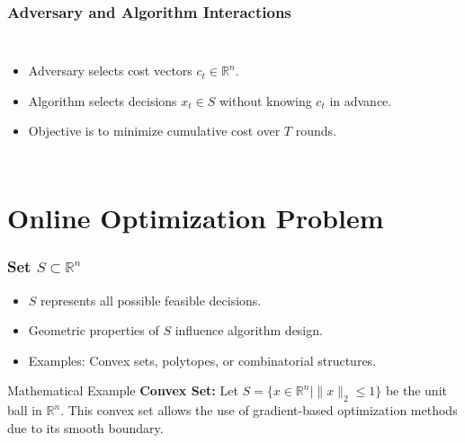 \documentclass{beamer}
\begin{document}
\begin{frame}
\frametitle{Adversary and Algorithm Interactions}
\begin{columns}
    \begin{itemize}
        \item Adversary selects cost vectors \( c_t \in \mathbb{R}^n \).
        \item Algorithm selects decisions \( x_t \in S \) without knowing \( c_t \) in advance.
        \item Objective is to minimize cumulative cost over \( T \) rounds.
    \end{itemize}
\end{columns}
\end{frame}

\section{Online Optimization Problem}

\begin{frame}
\frametitle{Set \( S \subset \mathbb{R}^n \)}
\begin{itemize}
    \item \( S \) represents all possible feasible decisions.
    \item Geometric properties of \( S \) influence algorithm design.
    \item Examples: Convex sets, polytopes, or combinatorial structures.
\end{itemize}
\begin{exampleblock}{Mathematical Example}
    \textbf{Convex Set:} Let \( S = \{ x \in \mathbb{R}^n \mid \|x\|_2 \leq 1 \} \) be the unit ball in \( \mathbb{R}^n \). This convex set allows the use of gradient-based optimization methods due to its smooth boundary.
\end{exampleblock}
\end{frame}
\end{document}
